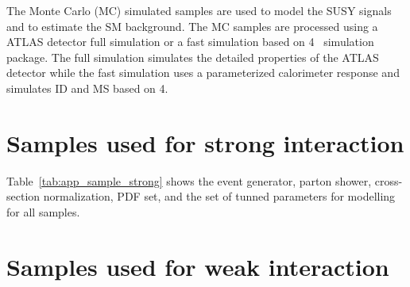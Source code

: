 The Monte Carlo (MC) simulated samples are used to model the SUSY signals and to estimate the SM background.
The MC samples are processed using a ATLAS detector full simulation or a fast simulation based on {\GEANT}4~\cite{} simulation package.
The full simulation simulates the detailed properties of the ATLAS detector while the fast simulation uses a parameterized calorimeter response and simulates ID and MS based on {\GEANT}4.


\section{Samples used for strong interaction}
\label{sec:app_samples_strong}

Table~\ref{tab:app_sample_strong} shows the event generator, parton shower, cross-section normalization, PDF set, and the set of tunned parameters for modelling for all samples.

\begin{table}[htp]
\caption{}
\label{tab:app_sample_strong}
\end{table}%



\section{Samples used for weak interaction}
\label{sec:app_samples}

